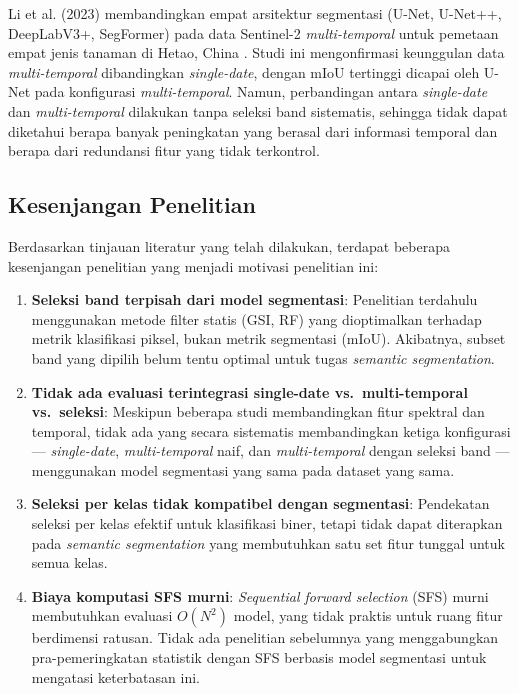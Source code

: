 Li et al. (2023) membandingkan empat arsitektur segmentasi (U-Net, U-Net++, DeepLabV3+, SegFormer) pada data Sentinel-2 \textit{multi-temporal} untuk pemetaan empat jenis tanaman di Hetao, China \citep{li2023}.
Studi ini mengonfirmasi keunggulan data \textit{multi-temporal} dibandingkan \textit{single-date}, dengan mIoU tertinggi dicapai oleh U-Net pada konfigurasi \textit{multi-temporal}.
Namun, perbandingan antara \textit{single-date} dan \textit{multi-temporal} dilakukan tanpa seleksi band sistematis, sehingga tidak dapat diketahui berapa banyak peningkatan yang berasal dari informasi temporal dan berapa dari redundansi fitur yang tidak terkontrol.

\subsection{Kesenjangan Penelitian}
Berdasarkan tinjauan literatur yang telah dilakukan, terdapat beberapa kesenjangan penelitian yang menjadi motivasi penelitian ini:

\begin{enumerate}
    \item \textbf{Seleksi band terpisah dari model segmentasi}: Penelitian terdahulu \citep{rs12010162, rs15040875} menggunakan metode filter statis (GSI, RF) yang dioptimalkan terhadap metrik klasifikasi piksel, bukan metrik segmentasi (mIoU). Akibatnya, subset band yang dipilih belum tentu optimal untuk tugas \textit{semantic segmentation}.

    \item \textbf{Tidak ada evaluasi terintegrasi single-date vs.\ multi-temporal vs.\ seleksi}: Meskipun beberapa studi \citep{li2023, yi2020} membandingkan fitur spektral dan temporal, tidak ada yang secara sistematis membandingkan ketiga konfigurasi — \textit{single-date}, \textit{multi-temporal} naif, dan \textit{multi-temporal} dengan seleksi band — menggunakan model segmentasi yang sama pada dataset yang sama.

    \item \textbf{Seleksi per kelas tidak kompatibel dengan segmentasi}: Pendekatan seleksi per kelas \citep{rs12010162} efektif untuk klasifikasi biner, tetapi tidak dapat diterapkan pada \textit{semantic segmentation} yang membutuhkan satu set fitur tunggal untuk semua kelas.

    \item \textbf{Biaya komputasi SFS murni}: \textit{Sequential forward selection} (SFS) murni membutuhkan evaluasi $O(N^2)$ model, yang tidak praktis untuk ruang fitur berdimensi ratusan. Tidak ada penelitian sebelumnya yang menggabungkan pra-pemeringkatan statistik dengan SFS berbasis model segmentasi untuk mengatasi keterbatasan ini.
\end{enumerate}

